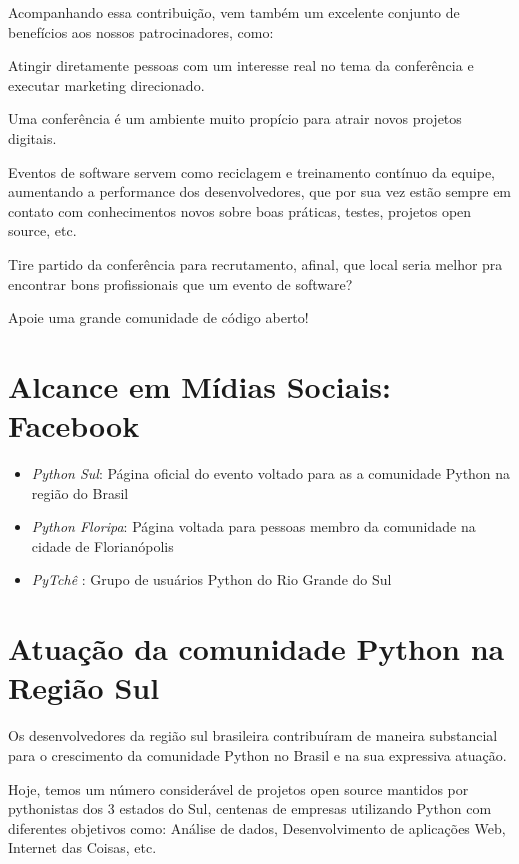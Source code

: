 \documentclass[12pt]{article}
\begin{document}
Acompanhando essa contribuição, vem também um excelente conjunto de benefícios aos nossos patrocinadores, como:
\begin{description}[align=right,labelwidth=4cm]
    \item [Visibilidade:] Atingir diretamente pessoas com um interesse real no tema da conferência e executar marketing direcionado.
    \item [Oportunidades:] Uma conferência é um ambiente muito propício para atrair novos projetos digitais.
    \item [Produtividade:] Eventos de software servem como reciclagem e treinamento contínuo da equipe, aumentando a performance dos desenvolvedores, que por sua vez estão sempre em contato com conhecimentos novos sobre boas práticas, testes, projetos open source, etc.
    \item [Contratação:] Tire partido da conferência para recrutamento, afinal, que local seria melhor pra encontrar bons profissionais que um evento de software?
    \item [Patrocínio:] Apoie uma grande comunidade de código aberto!
\end{description}

\section{Alcance em Mídias Sociais: Facebook}
\begin{itemize}[label={}]
    \item \emph{Python Sul}: Página oficial do evento voltado para as a comunidade Python na região do Brasil
    \item \emph{Python Floripa}: Página voltada para pessoas membro da comunidade na cidade de Florianópolis
    \item \emph{PyTchê }: Grupo de usuários Python do Rio Grande do Sul
\end{itemize}

\section{Atuação da comunidade Python na Região Sul}

Os desenvolvedores da região sul brasileira contribuíram de maneira substancial para o crescimento da comunidade Python no Brasil e na sua expressiva atuação.

Hoje, temos um número considerável de projetos open source mantidos por pythonistas dos 3 estados do Sul, centenas de empresas utilizando Python com diferentes objetivos como: Análise de dados, Desenvolvimento de aplicações Web, Internet das Coisas, etc.
\end{document}
